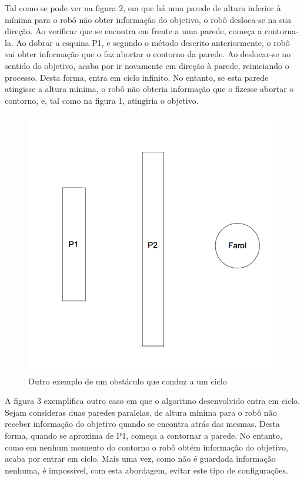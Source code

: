 \documentclass[citeauthoryear]{llncs} %
\begin{document}
Tal como se pode ver na figura 2, em que há uma parede de altura inferior à mínima para o robô não obter informação do objetivo, o robô desloca-se na sua direção. Ao verificar que se encontra em frente a uma parede, começa a contorna-la. Ao dobrar a esquina P1, e segundo o método descrito anteriormente, o robô vai obter informação que o faz abortar o contorno da parede. Ao deslocar-se no sentido do objetivo, acaba por ir novamente em direção à parede, reiniciando o processo. Desta forma, entra em ciclo infinito. No entanto, se esta parede atingisse a altura mínima, o robô não obteria informação que o fizesse abortar o contorno, e, tal como na figura 1, atingiria o objetivo.   

\begin{figure}[]
\begin{center}
\includegraphics[scale=0.20]{fig3.png}
\caption{Outro exemplo de um obstáculo que conduz a um ciclo}
\vspace{-20pt}
\end{center}
\end{figure}

A figura 3 exemplifica outro caso em que o algoritmo desenvolvido entra em ciclo. Sejam consideras duas paredes paralelas, de altura mínima para o robô não receber informação do objetivo quando se encontra atrás das mesmas. Desta forma, quando se aproxima de P1, começa a contornar a parede. No entanto, como em nenhum momento do contorno o robô obtém informação do objetivo, acaba por entrar em ciclo. Mais uma vez, como não é guardada informação nenhuma, é impossível, com esta abordagem, evitar este tipo de configurações.
\end{document}
